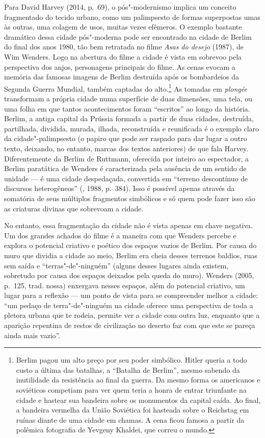 Para David Harvey (2014, p.~69), o pós"-modernismo implica um conceito
fragmentado do tecido urbano, como um palimpsesto de formas superpostas
umas às outras, uma colagem de usos, muitas vezes efêmeros. O exemplo
bastante dramático dessa cidade pós"-moderna pode ser encontrado na
cidade de Berlim do final dos anos 1980, tão bem retratada no filme
\emph{Asas do desejo} (1987), de Wim Wenders. Logo na abertura do filme
a cidade é vista em sobrevoo pela perspectiva dos anjos, personagens
principais do filme. As cenas evocam a memória das famosas imagens de
Berlim destruída após os bombardeios da Segunda Guerra Mundial, também
captadas do alto.\footnote{Berlim pagou um alto preço por seu poder
  simbólico. Hitler queria a todo custo a última das batalhas, a
  ``Batalha de Berlim'', mesmo sabendo da inutilidade da resistência ao
  final da guerra. Da mesmo forma os americanos e soviéticos competiam
  para ver quem teria a honra de entrar triunfante na cidade e hastear
  sua bandeira sobre os monumentos da capital caída. Ao final, a
  bandeira vermelha da União Soviética foi hasteada sobre o Reichstag em
  ruínas diante de uma cidade em chamas. A cena ficou famosa a partir da
  polêmica fotografia de Yevgeny Khaldei, que correu o mundo.} As
tomadas em \emph{plongée} transformam a própria cidade numa superfície
de duas dimensões, uma tela, ou uma folha em que tantos acontecimentos
foram ``escritos'' ao longo da história. Berlim, a antiga capital da
Prússia formada a partir de duas cidades, destruída, partilhada,
dividida, murada, ilhada, reconstruída e reunificada é o exemplo claro
da cidade"-palimpsesto (o papiro que pode ser raspado para dar lugar a
outro texto, deixando, no entanto, marcas dos textos anteriores) de que
fala Harvey. Diferentemente da Berlim de Ruttmann, oferecida por inteiro
ao espectador, a Berlim paratática de Wenders é caracterizada pela
ausência de um sentido de unidade --- é uma cidade despedaçada,
convertida em ``terreno descontínuo de discursos heterogêneos'' (,
1988, p.~384). Isso é possível apenas através da somatória de seus
múltiplos fragmentos simbólicos e só quem pode fazer isso são as
criaturas divinas que sobrevoam a cidade.

No entanto, essa fragmentação da cidade não é vista apenas em chave
negativa. Um dos grandes achados do filme é a maneira com que Wenders
percebe e explora o potencial criativo e poético dos espaços vazios de
Berlim. Por causa do muro que dividia a cidade ao meio, Berlim era cheia
desses terrenos baldios, ruas sem saída e ``terras"-de"-ninguém'' (alguns
desses lugares ainda existem, sobretudo por causa dos espaços deixados
pela queda do muro). Wenders (2005, p.~125, trad. nossa) enxergava
nesses espaços, além do potencial criativo, um lugar para a reflexão ---
um ponto de vista para se compreender melhor a cidade: ``um pedaço de
terra"-de"-ninguém na cidade oferece uma perspectiva de toda a pletora
urbana que te rodeia, permite ver a cidade com outra luz, enquanto que a
aparição repentina de restos de civilização no deserto faz com que este
se pareça ainda mais vazio''.

